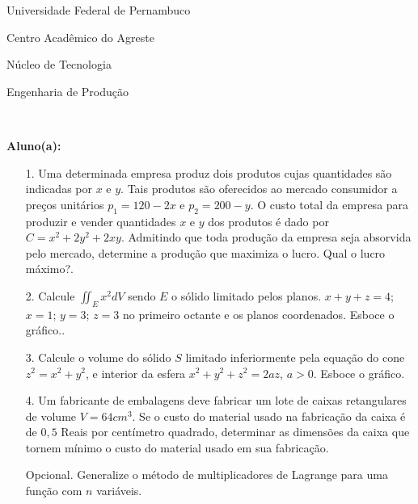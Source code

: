 \documentclass[oneside,a4paper,12pt]{article}
\newcommand{\universidade}{Universidade Federal de Pernambuco}
\newcommand{\centro}{Centro Acadêmico do Agreste}
\newcommand{\departamento}{Núcleo de Tecnologia}
\newcommand{\curso}{Engenharia de Produção}
\begin{document}
	\flushbottom
	\flushright
     \begin{center}
     	\vspace{10pt}
     	
     	\universidade
     	\par
     	\centro
     	\par
     	\departamento
     	\par
     	\curso
     	\par
     	\vspace{08pt}
     	\\
     \end{center}
     
     \begin{flushleft}
     	\textbf{Aluno(a):}
     \end{flushleft}
 
 \begin{itemize}
 	\item[1.] Uma determinada empresa produz dois produtos cujas quantidades são indicadas por $x$ e $y$. Tais produtos são oferecidos ao mercado consumidor a preços unitários $p_{1}=120-2x$ e $p_{2}=200-y$. O custo total da empresa para produzir e vender quantidades $x$ e $y$ dos produtos é dado por $C=x^{2}+2y^{2}+2xy$. Admitindo que toda produção da empresa seja absorvida pelo mercado, determine a produção que maximiza o lucro. Qual o lucro máximo?.
 \end{itemize}
 \begin{itemize}
 	\item[2.] Calcule $\iint_{E} x^{2}dV$ sendo $E$ o sólido limitado pelos planos. $x+y+z=4$; $x=1$; $y=3$; $z=3$ no primeiro octante e os planos coordenados. Esboce o gráfico.. 
 \end{itemize}
 \begin{itemize}
 	\item [3.] Calcule o volume do sólido $S$ limitado inferiormente pela equação do cone $z^{2}=x^{2}+y^{2}$, e interior da esfera $x^{2}+y^{2}+z^{2}=2az$, $a>0$. Esboce o gráfico.
 \end{itemize}
 \begin{itemize}
 	\item[4.] Um fabricante de embalagens deve fabricar um lote de caixas retangulares de volume $V=64cm^{3}$. Se o custo do material usado na fabricação da caixa é de $ 0,5$ Reais por centímetro quadrado, determinar as dimensões da caixa que tornem mínimo o custo do material usado em sua fabricação.
 \end{itemize}
 \begin{itemize}
 	\item[Opcional.] Generalize o método de multiplicadores de Lagrange para uma função com $n$ variáveis.
 \end{itemize}
\flushbottom
\flushright
\end{document}

